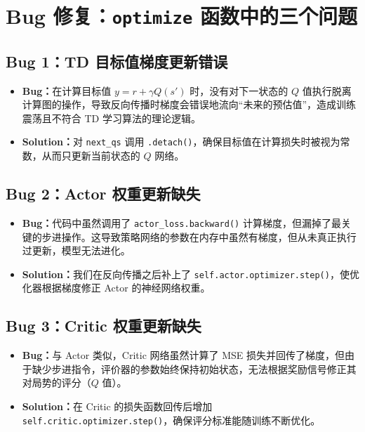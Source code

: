 \documentclass{article}
\begin{document}
\section{Bug 修复：\texttt{optimize} 函数中的三个问题}

\subsection{Bug 1：TD 目标值梯度更新错误}
\begin{itemize}
\item \textbf{Bug：}在计算目标值 $y = r + \gamma Q(s')$ 时，没有对下一状态的 $Q$ 值执行脱离计算图的操作，导致反向传播时梯度会错误地流向“未来的预估值”，造成训练震荡且不符合 TD 学习算法的理论逻辑。
\item \textbf{Solution：}对 \texttt{next\_qs} 调用 \texttt{.detach()}，确保目标值在计算损失时被视为常数，从而只更新当前状态的 $Q$ 网络。
\end{itemize}

\subsection{Bug 2：Actor 权重更新缺失}
\begin{itemize}
\item \textbf{Bug：}代码中虽然调用了 \texttt{actor\_loss.backward()} 计算梯度，但漏掉了最关键的步进操作。这导致策略网络的参数在内存中虽然有梯度，但从未真正执行过更新，模型无法进化。
\item \textbf{Solution：}我们在反向传播之后补上了 \texttt{self.actor.optimizer.step()}，使优化器根据梯度修正 Actor 的神经网络权重。
\end{itemize}

\subsection{Bug 3：Critic 权重更新缺失}
\begin{itemize}
\item \textbf{Bug：}与 Actor 类似，Critic 网络虽然计算了 MSE 损失并回传了梯度，但由于缺少步进指令，评价器的参数始终保持初始状态，无法根据奖励信号修正其对局势的评分（$Q$ 值）。
\item \textbf{Solution：}在 Critic 的损失函数回传后增加 \texttt{self.critic.optimizer.step()}，确保评分标准能随训练不断优化。
\end{itemize}
\end{document}
